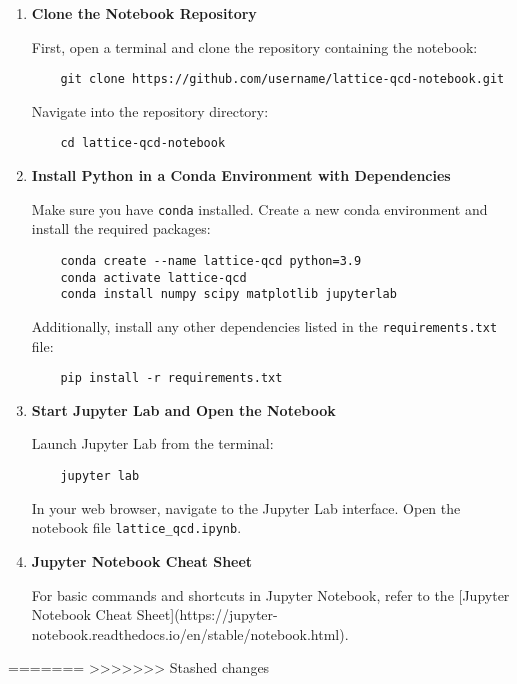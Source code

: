 \documentclass[11pt]{latex/exercise}
\begin{document}
\begin{enumerate}
    \item \textbf{Clone the Notebook Repository}

          First, open a terminal and clone the repository containing the notebook:
          \begin{verbatim}
    git clone https://github.com/username/lattice-qcd-notebook.git
    \end{verbatim}
          Navigate into the repository directory:
          \begin{verbatim}
    cd lattice-qcd-notebook
    \end{verbatim}

    \item \textbf{Install Python in a Conda Environment with Dependencies}

          Make sure you have \texttt{conda} installed. Create a new conda environment and install the required packages:
          \begin{verbatim}
    conda create --name lattice-qcd python=3.9
    conda activate lattice-qcd
    conda install numpy scipy matplotlib jupyterlab
    \end{verbatim}

          Additionally, install any other dependencies listed in the \texttt{requirements.txt} file:
          \begin{verbatim}
    pip install -r requirements.txt
    \end{verbatim}

    \item \textbf{Start Jupyter Lab and Open the Notebook}

          Launch Jupyter Lab from the terminal:
          \begin{verbatim}
    jupyter lab
    \end{verbatim}
          In your web browser, navigate to the Jupyter Lab interface. Open the notebook file \texttt{lattice\_qcd.ipynb}.

    \item \textbf{Jupyter Notebook Cheat Sheet}

          For basic commands and shortcuts in Jupyter Notebook, refer to the [Jupyter Notebook Cheat Sheet](https://jupyter-notebook.readthedocs.io/en/stable/notebook.html).
\end{enumerate}

=======
>>>>>>> Stashed changes
\end{document}
